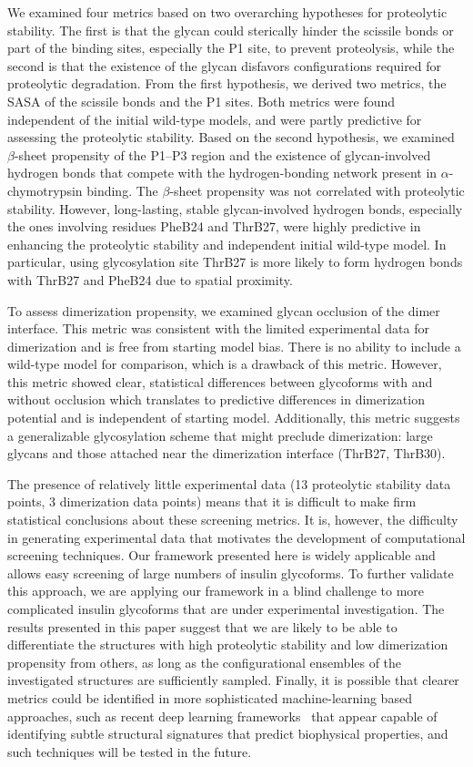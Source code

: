 \documentclass[9pt]{elife}
\begin{document}
We examined four metrics based on two overarching hypotheses for proteolytic stability. The first is that the glycan could sterically hinder the scissile bonds or part of the binding sites, especially the P1 site, to prevent proteolysis, while the second is that the existence of the glycan disfavors configurations required for proteolytic degradation. From the first hypothesis, we derived two metrics, the SASA of the scissile bonds and the P1 sites. Both metrics were found independent of the initial wild-type models, and were partly predictive for assessing the proteolytic stability. Based on the second hypothesis, we examined $\beta$-sheet propensity of the P1--P3 region and the existence of glycan-involved hydrogen bonds that compete with the hydrogen-bonding network present in $\alpha$-chymotrypsin binding.  The $\beta$-sheet propensity was not correlated with proteolytic stability. However, long-lasting, stable glycan-involved hydrogen bonds, especially the ones involving residues PheB24 and ThrB27, were highly predictive in enhancing the proteolytic stability and independent initial wild-type model.  In particular, using glycosylation site ThrB27 is more likely to form hydrogen bonds with ThrB27 and PheB24 due to spatial proximity.

To assess dimerization propensity, we examined glycan occlusion of the dimer interface. This metric was consistent with the limited experimental data for dimerization and is free from starting model bias. There is no ability to include a wild-type model for comparison, which is a drawback of this metric. However, this metric showed clear, statistical differences between glycoforms with and without occlusion which translates to predictive differences in dimerization potential and is independent of starting model. Additionally, this metric suggests a generalizable glycosylation scheme that might preclude dimerization: large glycans and those attached near the dimerization interface (ThrB27, ThrB30). 

The presence of relatively little experimental data (13 proteolytic stability data points, 3 dimerization data points) means that it is difficult to make firm statistical conclusions about these screening metrics.  It is, however, the difficulty in generating experimental data that motivates the development of computational screening techniques.  Our framework presented here is widely applicable and allows easy screening of large numbers of insulin glycoforms. To further validate this approach, we are applying our framework in a blind challenge to more complicated insulin glycoforms that are under experimental investigation. The results presented in this paper suggest that  we are likely to be able to differentiate the structures with high proteolytic stability and low dimerization propensity from others, as long as the configurational ensembles of the investigated structures are sufficiently sampled. Finally, it is possible that clearer metrics could be identified in more sophisticated machine-learning based approaches, such as recent deep learning frameworks~\cite{ward2021deep} that appear capable of identifying subtle structural signatures that predict biophysical properties, and such techniques will be tested in the future. 
\end{document}
